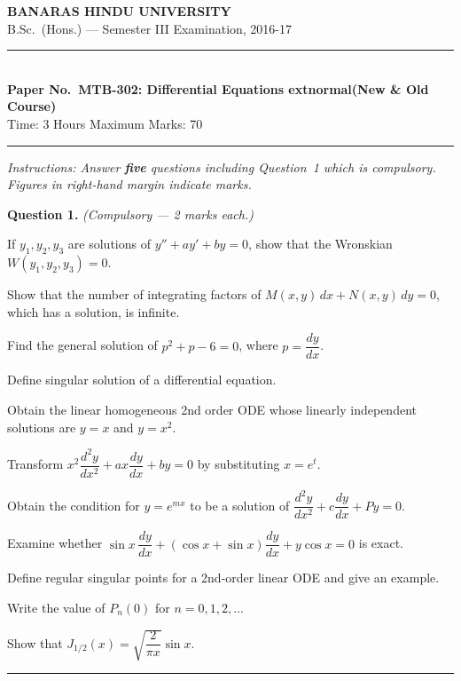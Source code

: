 \documentclass[11pt,a4paper]{article}
\begin{document}
\begin{center}
  {\large\bfseries BANARAS HINDU UNIVERSITY}\\[2pt]
  {\normalsize B.Sc.\ (Hons.) --- Semester III Examination, 2016-17}\\[6pt]
  \rule{0.8\linewidth}{0.5pt}\\[6pt]
  {\large\bfseries Paper No.\ MTB-302: Differential Equations  extnormal{(New \& Old Course)}}\\[4pt]
  {\normalsize Time: 3 Hours \hfill Maximum Marks: 70}
\end{center}
\rule{\linewidth}{0.4pt}
\smallskip



\noindent   \textit{Instructions: Answer   \textbf{five} questions including Question~1 which is compulsory. Figures in right-hand margin indicate marks.}
\bigskip




\noindent   \textbf{Question 1.}   \textit{(Compulsory --- 2 marks each.)}

\begin{parts}
  \item If $y_1, y_2, y_3$ are solutions of $y''+ay'+by=0$, show that the Wronskian $W(y_1,y_2,y_3)=0$.
  \item Show that the number of integrating factors of $M(x,y)\,dx+N(x,y)\,dy=0$, which has a solution, is infinite.
  \item Find the general solution of $p^2+p-6=0$, where $p=\dfrac{dy}{dx}$.
  \item Define singular solution of a differential equation.
  \item Obtain the linear homogeneous 2nd order ODE whose linearly independent solutions are $y=x$ and $y=x^2$.
  \item Transform $x^2\dfrac{d^2y}{dx^2}+ax\dfrac{dy}{dx}+by=0$ by substituting $x=e^t$.
  \item Obtain the condition for $y=e^{mx}$ to be a solution of $\dfrac{d^2y}{dx^2}+c\dfrac{dy}{dx}+Py=0$.
  \item Examine whether $\sin x\,\dfrac{dy}{dx}+(\cos x+\sin x)\dfrac{dy}{dx}+y\cos x=0$ is exact.
  \item Define regular singular points for a 2nd-order linear ODE and give an example.
  \item Write the value of $P_n(0)$ for $n=0,1,2,\ldots$
  \item Show that $J_{1/2}(x)=\sqrt{\dfrac{2}{\pi x}}\sin x$.
\end{parts}
\medskip\rule{\linewidth}{0.2pt}
\end{document}
